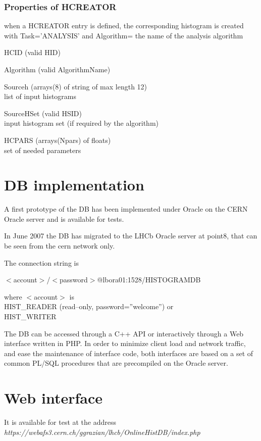 \documentclass{lhcbnote}
\begin{document}
\subsubsection{Properties of HCREATOR}
when a HCREATOR entry is defined, the corresponding histogram is
created with Task='ANALYSIS' and Algorithm= the name of the analysis algorithm
\begin{description}
\item{HCID} (valid HID)
\item{Algorithm} (valid AlgorithmName)
\item{Sourceh} (arrays(8) of string of max length 12)\\
list of input histograms
\item{SourceHSet} (valid HSID)\\
input histogram set (if required by the algorithm)
\item{HCPARS} (arrays(Npars) of floats)\\
set of needed parameters 
\end{description}

\section{DB implementation}
A first prototype of the DB has been implemented under Oracle on the
CERN Oracle server and is available for tests.
	
In June 2007 the DB has migrated to the LHCb Oracle server at point8,
that can be seen from the cern network only.

The connection string is \\
\centerline{$<$account$>$/$<$password$>$@lbora01:1528/HISTOGRAMDB}
where $<$account$>$ is \\
{HIST\_READER}   (read--only, password=''welcome'') or \\
{HIST\_WRITER} 

The DB can be accessed through a C++ API or interactively through a
Web interface written in PHP. In order to minimize client load and
network traffic, and ease the maintenance of interface code, both
interfaces  are based on a set of common PL/SQL procedures that are
precompiled on the Oracle server.

\section{Web interface}

It is available for test at the address\\
{\it https://webafs3.cern.ch/ggrazian/lhcb/OnlineHistDB/index.php}
\end{document}
